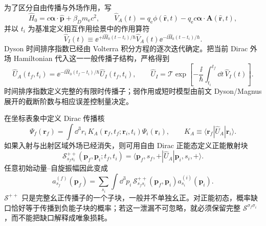 为了区分自由传播与外场作用，写
\begin{equation*}
\hat H_0=c\boldsymbol\alpha\cdot\hat{\mathbf p}+\beta_Dm_{\mathrm e} c^2,
\qquad
\hat V_A(t)=q_{\mathrm e}\phi(\hat{\mathbf r},t)-q_{\mathrm e} c\boldsymbol\alpha\cdot\mathbf A(\hat{\mathbf r},t),
\end{equation*}
并以 $t_i$ 为基准定义相互作用绘景中的作用算符
\begin{equation*}
\hat V_I(t)
\equiv
\ee^{+\ii\hat H_0(t-t_i)/\hbar}
\hat V_A(t)
\ee^{-\ii\hat H_0(t-t_i)/\hbar}.
\end{equation*}
Dyson 时间排序指数已经由 Volterra 积分方程的逐次迭代确定。把当前 Dirac 外场 Hamiltonian 代入这一一般传播子结构，严格得到
\begin{equation}
\boxed{
\hat U_A(t_f,t_i)
=\ee^{-\ii\hat H_0(t_f-t_i)/\hbar}\hat U_I(t_f,t_i),
\qquad
\hat U_I
=\mathcal T\exp\!\left[-\frac{\ii}{\hbar}
\int_{t_i}^{t_f}\dd t\,\hat V_I(t)\right].}
\label{eq:exact_external_field_interaction_picture}
\end{equation}
时间排序指数定义完整的有限时传播子；弱作用或短时模型由前文 Dyson/Magnus 展开的截断阶数与相应误差控制量决定。

在坐标表象中定义 Dirac 传播核
\begin{equation}
\boxed{
\Psi_f(\mathbf r_f)
=\int\dd^3 r_i\,
K_A(\mathbf r_f,t_f;\mathbf r_i,t_i)\Psi_i(\mathbf r_i),
\qquad
K_A\equiv\langle\mathbf r_f|\hat U_A|\mathbf r_i\rangle .}
\label{eq:exact_external_field_kernel}
\end{equation}
如果入射与出射区域外场已经消失，则可用自由 Dirac 正能态定义正能散射块
\begin{equation}
\boxed{
\mathcal S^{++}_{s_fs_i}(\mathbf p_f,\mathbf p_i;t_f,t_i)
=\langle\mathbf p_f,s_f,+|\hat U_A|\mathbf p_i,s_i,+\rangle .}
\label{eq:exact_positive_energy_external_scattering_kernel}
\end{equation}
任意初始动量--自旋振幅因此变成
\begin{equation}
\boxed{
a^{(f)}_{s_f}(\mathbf p_f)
=\sum_{s_i}\int\dd^3 p_i\,
\mathcal S^{++}_{s_fs_i}(\mathbf p_f,\mathbf p_i)
a^{(i)}_{s_i}(\mathbf p_i).}
\label{eq:exact_external_field_wavepacket_scattering}
\end{equation}
$\mathcal S^{++}$ 只是完整幺正传播子的一个子块，一般并不单独幺正。对正能初态，概率缺口恰好等于传播到负能子块的概率；若这一泄漏不可忽略，就必须保留完整 $\mathcal S^{\sigma_f\sigma_i}$，而不能把缺口解释成唯象损耗。

